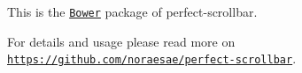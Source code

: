 This is the \href{https://bower.io/}{\tt Bower} package of perfect-\/scrollbar.

For details and usage please read more on \href{https://github.com/noraesae/perfect-scrollbar}{\tt https\+://github.\+com/noraesae/perfect-\/scrollbar}. 